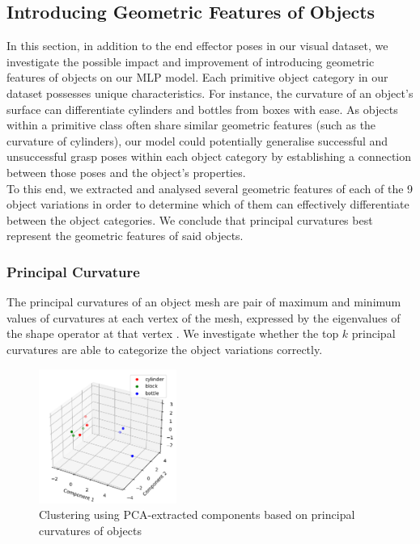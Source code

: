 \documentclass[11pt, a4paper]{report}
\begin{document}
\subsection{Introducing Geometric Features of Objects}\label{sec:5.2.3}
In this section, in addition to the end effector poses in our visual dataset, we investigate the possible impact and improvement of introducing geometric features of objects on our MLP model. Each primitive object category in our dataset possesses unique characteristics. For instance, the curvature of an object's surface can differentiate cylinders and bottles from boxes with ease. As objects within a primitive class often share similar geometric features (such as the curvature of cylinders), our model could potentially generalise successful and unsuccessful grasp poses within each object category by establishing a connection between those poses and the object's properties.\\

To this end, we extracted and analysed several geometric features of each of the 9 object variations in order to determine which of them can effectively differentiate between the object categories. We conclude that principal curvatures best represent the geometric features of said objects.


\subsubsection{Principal Curvature}\label{sec:5.2.3.1}
The principal curvatures of an object mesh are pair of maximum and minimum values of curvatures at each vertex of the mesh, expressed by the eigenvalues of the shape operator at that vertex \cite{enwiki:1141654906}. We investigate whether the top $k$ principal curvatures are able to categorize the object variations correctly.

\begin{figure}[H]
    \centering
    \includegraphics[width=0.4\textwidth]{docs/Project Report/Media/5_2_3_principal_curvature_3d.png}
    \caption{Clustering using PCA-extracted components based on principal curvatures of objects}
    \label{fig:5.2}
\end{figure}
\end{document}
